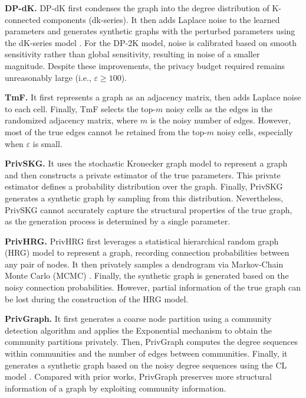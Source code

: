 \documentclass[conference]{IEEEtran}
\theoremstyle{plain}
\begin{document}
\textbf{DP-dK.}
DP-dK first condenses the graph into the degree distribution of K-connected components (dk-series). 
It then adds Laplace noise to the learned parameters and generates synthetic graphs with the perturbed parameters using the dK-series model \cite{mahadevan2006systematic}. 
For the DP-2K model, noise is calibrated based on smooth sensitivity rather than global sensitivity, resulting in noise of a smaller magnitude. 
Despite these improvements, the privacy budget required remains unreasonably large (i.e., $\varepsilon \geq 100$).

\textbf{TmF.}
It first represents a graph as an adjacency matrix, then adds Laplace noise to each cell. 
Finally, TmF selects the top-$m$ noisy cells as the edges in the randomized adjacency matrix, where $m$ is the noisy number of edges. 
However, most of the true edges cannot be retained from the top-$m$ noisy cells, especially when $\varepsilon$ is small.

\textbf{PrivSKG.}
It uses the stochastic Kronecker graph model to represent a graph and then constructs a private estimator of the true parameters. 
This private estimator defines a probability distribution over the graph. 
Finally, PrivSKG generates a synthetic graph by sampling from this distribution. 
Nevertheless, PrivSKG cannot accurately capture the structural properties of the true graph, as the generation process is determined by a single parameter.

\textbf{PrivHRG.}
PrivHRG first leverages a statistical hierarchical random graph (HRG) model \cite{clauset2008hierarchical} to represent a graph, recording connection probabilities between any pair of nodes. 
It then privately samples a dendrogram via Markov-Chain Monte Carlo (MCMC) \cite{metropolis1953equation}. 
Finally, the synthetic graph is generated based on the noisy connection probabilities. 
However, partial information of the true graph can be lost during the construction of the HRG model.

\textbf{PrivGraph.}
It first generates a coarse node partition using a community detection algorithm and applies the Exponential mechanism to obtain the community partitions privately. 
Then, PrivGraph computes the degree sequences within communities and the number of edges between communities. 
Finally, it generates a synthetic graph based on the noisy degree sequences using the CL model \cite{aiello2000random}. 
Compared with prior works, PrivGraph preserves more structural information of a graph by exploiting community information.
\end{document}
